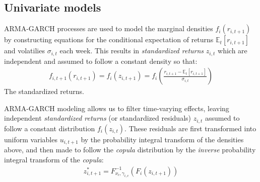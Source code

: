 
\subsection{Univariate models} %
\label{sub:univariate_models}

ARMA-GARCH processes are used to model the marginal densities $f_i(r_{i,t+1})$
by constructing equations for the conditional expectation of returns $\mathbb{E}_t[r_{i,t+1}]$ and volatilies $\sigma_{i,t}$ each week. This results in \emph{standardized returns} $z_{i,t}$ which are independent and assumed to follow a constant density so that:
\begin{align}
  f_{i,t+1}(r_{i,t+1}) = f_i(z_{i,t+1}) = f_i(\frac{r_{i,t+1} - \mathbb{E}_t[r_{i,t+1}]}{\sigma_{i,t}})
\end{align}
The standardized returns.

ARMA-GARCH modeling allows us to filter time-varying effects, leaving independent \emph{standardized returns} (or standardized residuals) $z_{i,t}$ assumed to follow a constant distribution $f_i(z_{i,t})$. These residuals are first transformed into uniform variables $u_{i,t+1}$ by the probability integral transform of the densities above, and then made to follow the \emph{copula} distribution by the \emph{inverse} probability integral transform of the \emph{copula}:
\begin{align}
  z_{i,t+1}^* = F^{-1}_{\nu_c,\gamma_{i,c}}(F_{i}(z_{i,t+1}))
\end{align}


